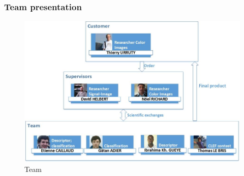 \documentclass[xcolor=table]{beamer}
\begin{document}

\begin{frame} \frametitle{Team presentation}

\begin{figure}[h]
    \center
    \includegraphics[scale=0.45]{Dessin1.jpg}
    \caption{Team}\label{fig:team}
\end{figure}

\end{frame}



\end{document}
